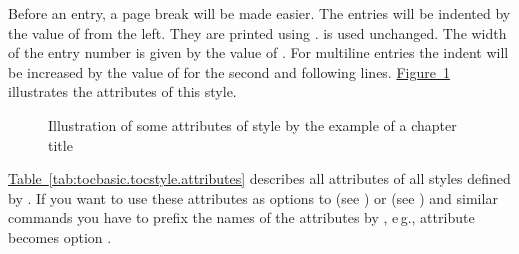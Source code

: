\begin{description}
  Before an entry, a page break will be made easier. The entries will be
  indented by the value of  from the left. They are printed
  using .  is used unchanged. The width of
  the entry number is given by the value of . For multiline
  entries the indent will be increased by the value of  for
  the second and following lines. \hyperref[fig:tocbasic.undottedtocline]%
  {Figure~\ref*{fig:tocbasic.undottedtocline}} illustrates the attributes of
  this style.
  \begin{figure}
    \centering
    \caption{Illustration of some attributes of style 
      by the example of a chapter title}%
    \label{fig:tocbasic.undottedtocline}
  \end{figure}
\end{description}
\hyperref[tab:tocbasic.tocstyle.attributes]%
{Table~\ref*{tab:tocbasic.tocstyle.attributes}} describes all attributes of
all styles defined by . If you want to use these attributes
as options to  (see
) or
 (see
) and similar
commands you have to prefix the names of the attributes by , e\,g.,
attribute  becomes option .

